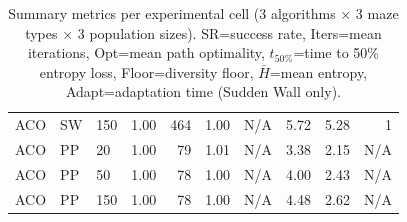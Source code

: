 \begin{table}[ht]
\begin{tabular}{lllrrrrrrr}
ACO & SW & 150 & 1.00 & 464 & 1.00 & N/A & 5.72 & 5.28 & 1 \\
ACO & PP & 20 & 1.00 & 79 & 1.01 & N/A & 3.38 & 2.15 & N/A \\
ACO & PP & 50 & 1.00 & 78 & 1.00 & N/A & 4.00 & 2.43 & N/A \\
ACO & PP & 150 & 1.00 & 78 & 1.00 & N/A & 4.48 & 2.62 & N/A \\
\bottomrule
\end{tabular}
\caption{Summary metrics per experimental cell (3 algorithms × 3 maze types × 3 population sizes). SR=success rate, Iters=mean iterations, Opt=mean path optimality, $t_{50\%}$=time to 50\% entropy loss, Floor=diversity floor, $\bar{H}$=mean entropy, Adapt=adaptation time (Sudden Wall only).}
\label{tab:summary}
\end{table}
